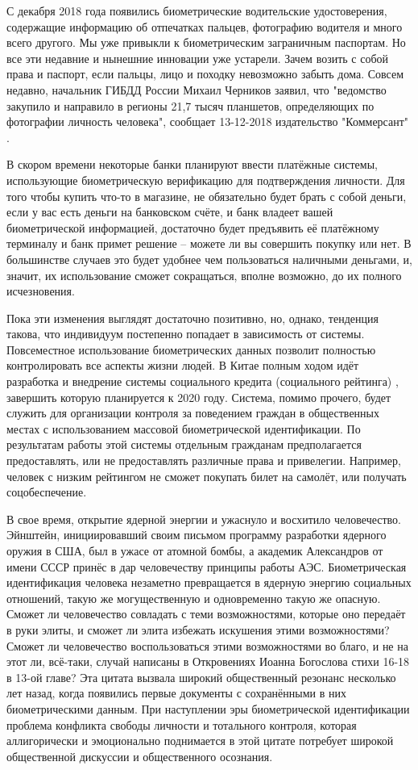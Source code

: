 \documentclass[14pt, a4paper]{extarticle}
\begin{document}
С декабря 2018 года появились биометрические водительские удостоверения, содержащие информацию об отпечатках пальцев, фотографию водителя и много всего другого. Мы уже привыкли к биометрическим заграничным паспортам. Но все эти недавние и нынешние инновации уже устарели. Зачем возить с собой права и паспорт, если пальцы, лицо и походку невозможно забыть дома. Совсем недавно, начальник ГИБДД России Михаил Черников заявил, что "ведомство закупило и направило в регионы 21,7 тысяч планшетов, определяющих по фотографии личность человека", сообщает 13-12-2018 издательство "Коммерсант" \cite{kommersant}.

В скором времени некоторые банки планируют ввести платёжные системы, использующие биометрическую верификацию для подтверждения личности. Для того чтобы купить что-то в магазине, не обязательно будет брать с собой деньги, если у вас есть деньги на банковском счёте, и банк владеет вашей биометрической информацией, достаточно будет предъявить её платёжному терминалу и банк примет решение – можете ли вы совершить покупку или нет. В большинстве случаев это будет удобнее чем пользоваться наличными деньгами, и, значит, их использование сможет сокращаться, вполне возможно, до их полного исчезновения. 

Пока эти изменения выглядят достаточно позитивно, но, однако, тенденция такова, что индивидуум постепенно попадает в зависимость от системы. Повсеместное использование биометрических данных позволит полностью контролировать все аспекты жизни людей. В Китае полным ходом идёт разработка и внедрение системы социального кредита (социального рейтинга) \cite{social_score}, завершить которую планируется к 2020 году. Система, помимо прочего, будет служить для организации контроля за поведением граждан в общественных местах с использованием массовой биометрической идентификации. По результатам работы этой системы отдельным гражданам предполагается предоставлять, или не предоставлять различные права и привелегии. Например, человек с низким рейтингом не сможет покупать билет на самолёт, или получать соцобеспечение.

В свое время, открытие ядерной энергии и ужаснуло и восхитило человечество. Эйнштейн, инициировавший своим письмом программу разработки ядерного оружия в США, был в ужасе от атомной бомбы, а академик Александров от имени СССР принёс в дар человечеству принципы работы АЭС. Биометрическая идентификация человека незаметно превращается в ядерную энергию социальных отношений, такую же могущественную и одновременно такую же опасную. Сможет ли человечество совладать с теми возможностями, которые оно передаёт в руки элиты, и сможет ли элита избежать искушения этими возможностями? Сможет ли человечество воспользоваться этими возможностями во благо, и не на этот ли, всё-таки, случай написаны в Откровениях Иоанна Богослова стихи 16-18 в 13-ой главе? \cite{bible} Эта цитата вызвала широкий общественный резонанс несколько лет назад, когда появились первые документы с сохранёнными в них биометрическими данным. При наступлении эры биометрической идентификации проблема конфликта свободы личности и тотального контроля, которая аллигорически и эмоционально поднимается в этой цитате потребует широкой общественной дискуссии и общественного осознания.
\end{document}
